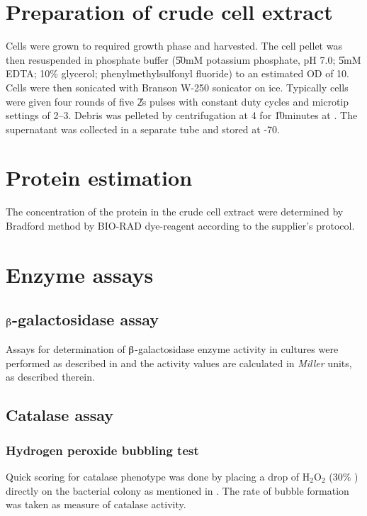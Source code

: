 \section{Preparation of crude cell extract}

\label{crude} Cells were grown to required growth phase and
harvested. The cell pellet was then resuspended  in phosphate
buffer (\U{50}{mM} potassium phosphate, pH 7.0; \U{5}{mM} EDTA;
10\% glycerol;  phenylmethylsulfonyl fluoride) to an
estimated OD of 10. Cells were then sonicated with Branson W-250
sonicator on ice. Typically cells were given four rounds of five
\U{2}{s} pulses with constant duty cycles and microtip settings of
2--3. Debris was pelleted by centrifugation at 4\dg{} for
\U{10}{minutes} at . The supernatant was collected in a
separate tube and stored at -70\dg.

\section{Protein estimation}

The concentration of the protein in the crude cell extract were
determined by Bradford method \citep{Bradford1976} by BIO-RAD
dye-reagent{\scriptsize\texttrademark} according to the supplier's
protocol.

\section{Enzyme assays}

\subsection{$\betaup$-galactosidase assay}
Assays for determination of $\betaup$-galactosidase enzyme
activity in cultures were performed as described in
\citet{Miller1992} and the activity values are calculated in
\emph{Miller} units, as described therein.

\subsection{Catalase assay}

\subsubsection{Hydrogen peroxide bubbling test}

Quick scoring for catalase phenotype was done by placing a drop of
H$_{2}$O$_{2}$ (30\% ) directly on the bacterial
colony as mentioned in \citet{Mulvey1988}. The rate of bubble
formation was taken as measure of catalase activity.

